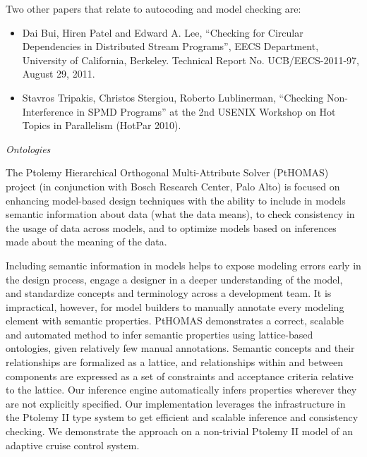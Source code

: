                Two other papers that relate to autocoding and model checking are:
               \begin{itemize}
               \item Dai Bui, Hiren Patel and Edward A. Lee, ``Checking for Circular Dependencies in Distributed Stream Programs'', \cite{Bui:EECS-2011-97}
                 EECS Department, University of California, Berkeley. Technical Report No. UCB/EECS-2011-97, August 29, 2011.

               \item Stavros Tripakis, Christos Stergiou, Roberto
                 Lublinerman, ``Checking Non-Interference in SPMD Programs''
                 \cite{TripakisStergiouLublinerman10_CheckingNonInterferenceInSPMDPrograms}
                 at the 2nd USENIX Workshop on Hot Topics in Parallelism (HotPar 2010).
               \end{itemize}


               \emph{Ontologies}

               The Ptolemy Hierarchical Orthogonal Multi-Attribute Solver
               (PtHOMAS) project (in conjunction with Bosch Research Center, Palo
               Alto) is focused on enhancing model-based design techniques with the
               ability to include in models semantic information about data (what the
               data means), to check consistency in the usage of data across models,
               and to optimize models based on inferences made about the meaning of
               the data. 

               Including semantic information in models helps to expose modeling
               errors early in the design process, engage a designer in a deeper
               understanding of the model, and standardize concepts and terminology
               across a development team.  It is impractical, however, for model
               builders to manually annotate every modeling element with semantic
               properties.  PtHOMAS demonstrates a correct, scalable and automated
               method to infer semantic properties using lattice-based ontologies,
               given relatively few manual annotations.  Semantic concepts and their
               relationships are formalized as a lattice, and relationships within
               and between components are expressed as a set of constraints and
               acceptance criteria relative to the lattice.  Our inference engine
               automatically infers properties wherever they are not explicitly
               specified.  Our implementation leverages the infrastructure in the
               Ptolemy II type system to get efficient and scalable inference and
               consistency checking. We demonstrate the approach on a non-trivial
               Ptolemy II model of an adaptive cruise control system.

